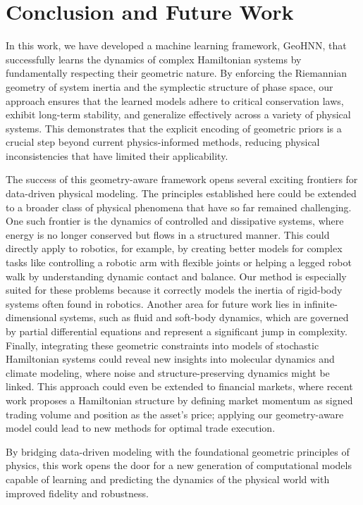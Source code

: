 \documentclass{article}
\theoremstyle{plain}
\theoremstyle{definition}
\theoremstyle{remark}
\begin{document}
\section{Conclusion and Future Work}
In this work, we have developed a machine learning framework, GeoHNN, that successfully learns the dynamics of complex Hamiltonian systems by fundamentally respecting their geometric nature. By enforcing the Riemannian geometry of system inertia and the symplectic structure of phase space, our approach ensures that the learned models adhere to critical conservation laws, exhibit long-term stability, and generalize effectively across a variety of physical systems. This demonstrates that the explicit encoding of geometric priors is a crucial step beyond current physics-informed methods, reducing physical inconsistencies that have limited their applicability.

The success of this geometry-aware framework opens several exciting frontiers for data-driven physical modeling. The principles established here could be extended to a broader class of physical phenomena that have so far remained challenging. One such frontier is the dynamics of controlled and dissipative systems, where energy is no longer conserved but flows in a structured manner. This could directly apply to robotics, for example, by creating better models for complex tasks like controlling a robotic arm with flexible joints or helping a legged robot walk by understanding dynamic contact and balance. Our method is especially suited for these problems because it correctly models the inertia of rigid-body systems often found in robotics. Another area for future work lies in infinite-dimensional systems, such as fluid and soft-body dynamics, which are governed by partial differential equations and represent a significant jump in complexity. Finally, integrating these geometric constraints into models of stochastic Hamiltonian systems could reveal new insights into molecular dynamics and climate modeling, where noise and structure-preserving dynamics might be linked. This approach could even be extended to financial markets, where recent work proposes a Hamiltonian structure by defining market momentum as signed trading volume and position as the asset’s price; applying our geometry-aware model could lead to new methods for optimal trade execution.

By bridging data-driven modeling with the foundational geometric principles of physics, this work opens the door for a new generation of computational models capable of learning and predicting the dynamics of the physical world with improved fidelity and robustness.
\end{document}
